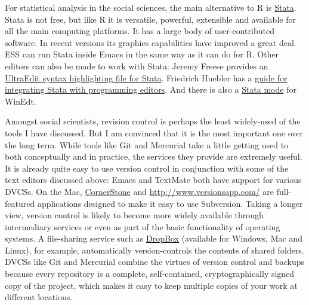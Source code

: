 \documentclass[11pt,article,oneside]{memoir}
\begin{document}
For statistical analysis in the social sciences, the main alternative to R is \href{http://www.stata.com/}{Stata}. Stata is not free, but like R it is versatile, powerful, extensible and available for all the main computing platforms. It has a large body of user-contributed software. In recent versions its graphics capabilities have improved a great deal. ESS can run Stata inside Emacs in the same way as it can do for R. Other editors can also be made to work with Stata: Jeremy Freese provides an  \href{http://www.jeremyfreese.com/#other%20research}{UltraEdit syntax highlighting file for Stata}. Friedrich Huebler has a \href{http://mysite.verizon.net/huebler/2005/20050310_Stata_editor.html}{guide for integrating Stata with programming editors}. And there is also a \href{http://www.winedt.org/Config/modes/Stata.php}{Stata mode} for WinEdt.   

Amongst social scientists, revision control is perhaps the least widely-used of the tools I have discussed. But I am convinced that it is the most important one over the long term. While tools like Git and Mercurial take a little getting used to both conceptually and in practice, the services they provide are extremely useful. It is already quite easy to use version control in conjunction with some of the text editors discussed above: Emacs and TextMate both have support for various DVCSs. On the Mac, \href{http://www.zennaware.com/cornerstone/}{CornerStone} and \href{Versions}{http://www.versionsapp.com/} are full-featured applications designed to make it easy to use Subversion. Taking a longer view, version control is likely to become more widely available through intermediary services or even as part of the basic functionality of operating systems. A file-sharing service such as \href{https://www.getdropbox.com/}{DropBox} (available for Windows, Mac and Linux), for example, automatically version-controls the contents of shared folders. DVCSs like Git and Mercurial combine the virtues of version control and backups because every repository is a complete, self-contained, cryptographically signed copy of the project, which makes it easy to keep multiple copies of your work at different locations. 
\end{document}
